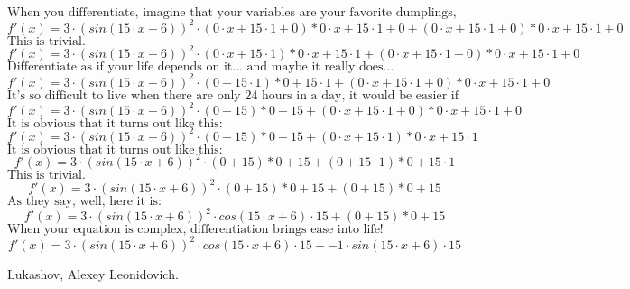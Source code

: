 \documentclass{article}
\begin{document}
$
\text{When you differentiate, imagine that your variables are your favorite dumplings, and you're separating them to discover their secret recipe.}$
$$f'(x) =  3 \cdot ( sin( 15 \cdot x + 6 ) ) ^ { 2 } \cdot ( 0 \cdot x + 15 \cdot 1 + 0 ) * 0 \cdot x + 15 \cdot 1 + 0 + ( 0 \cdot x + 15 \cdot 1 + 0 ) * 0 \cdot x + 15 \cdot 1 + 0 $$
$
\text{This is trivial.}$
$$f'(x) =  3 \cdot ( sin( 15 \cdot x + 6 ) ) ^ { 2 } \cdot ( 0 \cdot x + 15 \cdot 1 ) * 0 \cdot x + 15 \cdot 1 + ( 0 \cdot x + 15 \cdot 1 + 0 ) * 0 \cdot x + 15 \cdot 1 + 0 $$
$
\text{Differentiate as if your life depends on it... and maybe it really does...}$
$$f'(x) =  3 \cdot ( sin( 15 \cdot x + 6 ) ) ^ { 2 } \cdot ( 0 + 15 \cdot 1 ) * 0 + 15 \cdot 1 + ( 0 \cdot x + 15 \cdot 1 + 0 ) * 0 \cdot x + 15 \cdot 1 + 0 $$
$
\text{It's so difficult to live when there are only 24 hours in a day, it would be easier if there were more!}$
$$f'(x) =  3 \cdot ( sin( 15 \cdot x + 6 ) ) ^ { 2 } \cdot ( 0 + 15 ) * 0 + 15 + ( 0 \cdot x + 15 \cdot 1 + 0 ) * 0 \cdot x + 15 \cdot 1 + 0 $$
$
\text{It is obvious that it turns out like this:}$
$$f'(x) =  3 \cdot ( sin( 15 \cdot x + 6 ) ) ^ { 2 } \cdot ( 0 + 15 ) * 0 + 15 + ( 0 \cdot x + 15 \cdot 1 ) * 0 \cdot x + 15 \cdot 1 $$
$
\text{It is obvious that it turns out like this:}$
$$f'(x) =  3 \cdot ( sin( 15 \cdot x + 6 ) ) ^ { 2 } \cdot ( 0 + 15 ) * 0 + 15 + ( 0 + 15 \cdot 1 ) * 0 + 15 \cdot 1 $$
$
\text{This is trivial.}$
$$f'(x) =  3 \cdot ( sin( 15 \cdot x + 6 ) ) ^ { 2 } \cdot ( 0 + 15 ) * 0 + 15 + ( 0 + 15 ) * 0 + 15 $$
$
\text{As they say, well, here it is:}$
$$f'(x) =  3 \cdot ( sin( 15 \cdot x + 6 ) ) ^ { 2 } \cdot cos( 15 \cdot x + 6 ) \cdot 15 + ( 0 + 15 ) * 0 + 15 $$
$
\text{When your equation is complex, differentiation brings ease into life!}$
$$f'(x) =  3 \cdot ( sin( 15 \cdot x + 6 ) ) ^ { 2 } \cdot cos( 15 \cdot x + 6 ) \cdot 15 + -1 \cdot sin( 15 \cdot x + 6 ) \cdot 15 $$
\newpage\begin{thebibliography}{9}Lukashov, Alexey Leonidovich.\end{thebibliography}
\end{document}
